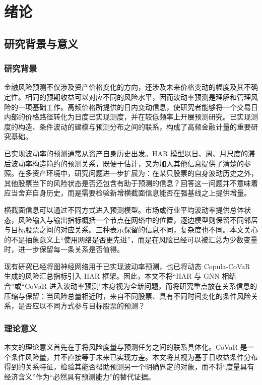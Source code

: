 \chapter{绪论}
\section{研究背景与意义}
\subsection{研究背景}
金融风险预测不仅涉及资产价格变化的方向，还涉及未来价格变动的幅度及其不确定性。相同的预期收益可以对应不同的风险水平，因而波动率预测是理解和管理风险的一项基础工作。高频价格所提供的日内变动信息，使研究者能够将一个交易日内部的价格路径转化为日度已实现测度，并在较低频率上开展预测研究。已实现测度的构造、条件波动的建模与预测分布之间的联系，构成了高频金融计量的重要研究基础\cite{andersen2003}。

已实现波动率的预测通常从资产自身历史出发。HAR 模型以日、周、月尺度的滞后波动率构造简约的预测关系，既便于估计，又为加入其他信息提供了清楚的参照\cite{corsi2009}。在多资产环境中，研究问题进一步扩展为：在某只股票的自身波动历史之外，其他股票当下的风险状态是否还包含有助于预测的信息？回答这一问题并不意味着应当舍弃自身历史，而是需要检验新增横截面信息能否在强基线之上提供增量。

横截面信息可以通过不同方式进入预测模型。市场或行业平均波动率提供总体状态，风险输入与输出指标概括一个节点在网络中的位置，逐边模型则保留不同邻居与目标股票之间的对应关系。三种表示保留的信息不同，复杂度也不同。本文关心的不是抽象意义上“使用网络是否更先进”，而是在风险已经可以被汇总为少数变量时，进一步保留每一条关系是否值得。

现有研究已经将图神经网络用于已实现波动率预测，也已将动态 Copula-CoVaR 生成的风险汇总指标引入 HAR 框架\cite{zhang2025,wang2026}。因此，本文不将“HAR 与 GNN 相结合”或“CoVaR 进入波动率预测”本身视为全新问题，而将研究重点放在关系信息的压缩与保留：当风险总量相近时，来自不同股票、具有不同时间变化的条件风险关系，是否应以不同方式参与目标股票的预测？

\subsection{理论意义}
本文的理论意义首先在于将风险度量与预测任务之间的联系具体化。CoVaR 是一个条件风险量，并不直接等于未来已实现方差。本文将其视为基于日收益条件分布得到的关系特征，检验其能否帮助预测另一个明确界定的对象，而不将“度量具有经济含义”作为“必然具有预测能力”的替代证据。

